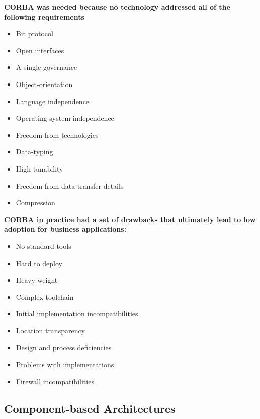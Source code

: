 \begin{minipage}[t]{0.45\textwidth}
  \textbf{CORBA was needed because no technology addressed all of the following requirements}
  \begin{itemize}[topsep=0pt,noitemsep]
    \item Bit protocol
    \item Open interfaces
    \item A single governance
    \item Object-orientation
    \item Language independence
    \item Operating system independence
    \item Freedom from technologies
    \item Data-typing
    \item High tunability
    \item Freedom from data-transfer details
    \item Compression
  \end{itemize}
\end{minipage}
\hspace{.05\textwidth}
\begin{minipage}[t]{0.45\textwidth}
  \textbf{CORBA in practice had a set of drawbacks that ultimately lead to low adoption for business applications:}
  \begin{itemize}[topsep=0pt, noitemsep]
    \item No standard tools
    \item Hard to deploy
    \item Heavy weight
    \item Complex toolchain
    \item Initial implementation incompatibilities
    \item Location transparency
    \item Design and process deficiencies
    \item Problems with implementations
    \item Firewall incompatibilities
  \end{itemize}
\end{minipage}
\vspace{20pt}

\subsection{Component-based Architectures}
